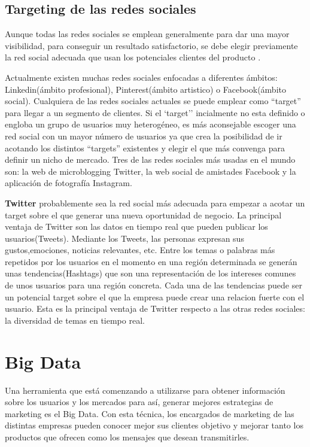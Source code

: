 \subsection{Targeting de las redes sociales}

Aunque todas las redes sociales se emplean generalmente para dar una mayor visibilidad, para conseguir un resultado satisfactorio, se debe elegir previamente la red social adecuada que usan los potenciales clientes del producto \cite{social-targetting}.

\vspace{5 mm}

Actualmente existen muchas redes sociales enfocadas a diferentes ámbitos: Linkedin(ámbito profesional), Pinterest(ámbito artistico) o Facebook(ámbito social). Cualquiera de las redes sociales actuales se puede emplear como ``target'' para llegar a un segmento de clientes. Si el `target'' incialmente no esta definido o engloba un grupo de usuarios muy heterogéneo, es más aconsejable escoger una red social con  un mayor número de usuarios ya que crea la posibilidad de ir acotando los distintos ``targets'' existentes y elegir el que más convenga para definir un nicho de mercado. Tres de las redes sociales más usadas en el mundo son: la web de microblogging Twitter, la web social de amistades Facebook y la aplicación de fotografía Instagram.

\vspace{5 mm}

\textbf{Twitter} probablemente sea la red social más adecuada para empezar a acotar un target sobre el que generar una nueva oportunidad de negocio.
La principal ventaja de Twitter son las datos en tiempo real que pueden publicar los usuarios(Tweets). Mediante los Tweets, las personas expresan sus
gustos,emociones, noticias relevantes, etc. Entre los temas o palabras más repetidos por los usuarios en el momento en una región determinada se generán
unas tendencias(Hashtags) que son una representación de los intereses comunes de unos usuarios para una región concreta. Cada una de las tendencias puede
ser un potencial target sobre el que la empresa puede crear una relacion fuerte con el usuario. Esta es la principal ventaja de Twitter respecto a las otras redes
sociales: la diversidad de temas en tiempo real.

\section{Big Data}

Una herramienta que está comenzando a utilizarse para obtener información sobre los usuarios y los mercados para así, generar mejores estrategias de marketing es el Big Data. Con esta técnica, los encargados de marketing de las distintas empresas pueden conocer mejor sus clientes objetivo y mejorar tanto los productos que ofrecen como los mensajes que desean transmitirles.

